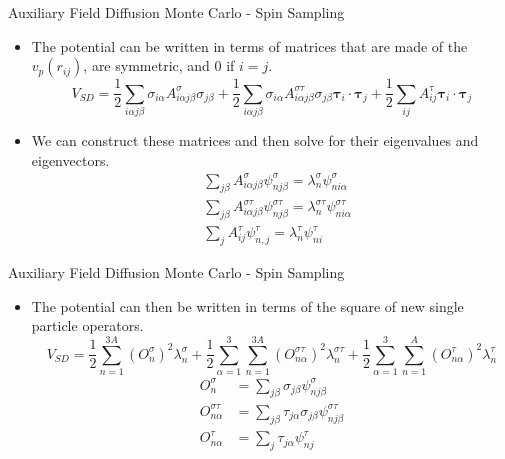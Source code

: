 \documentclass{beamer}
\newcommand{\ti}{\bm{\tau}_i}
\newcommand{\tj}{\bm{\tau}_j}
\begin{document}
\begin{frame}{Auxiliary Field Diffusion Monte Carlo - Spin Sampling}
\begin{itemize}
   \item The potential can be written in terms of matrices that are made of the $v_p(r_{ij})$, are symmetric, and 0 if $i=j$.
   \begin{equation*}
      V_{SD} = \frac{1}{2}\sum\limits_{i\alpha j\beta} \sigma_{i\alpha}A^{\sigma}_{i\alpha j\beta}\sigma_{j\beta}
      + \frac{1}{2}\sum\limits_{i\alpha j\beta} \sigma_{i\alpha}A^{\sigma\tau}_{i\alpha j\beta}\sigma_{j\beta}\ti\cdot\tj
      + \frac{1}{2}\sum\limits_{ij} A^{\tau}_{ij}\ti\cdot\tj
   \end{equation*}
   \item We can construct these matrices and then solve for their eigenvalues and eigenvectors.
\begin{align*}
   &\sum\limits_{j\beta} A^{\sigma}_{i\alpha j\beta}\psi^{\sigma}_{nj\beta} = \lambda^{\sigma}_n\psi^{\sigma}_{ni\alpha} \\
   &\sum\limits_{j\beta} A^{\sigma\tau}_{i\alpha j\beta}\psi^{\sigma\tau}_{n j\beta} = \lambda^{\sigma\tau}_n\psi^{\sigma\tau}_{ni\alpha} \\
   &\sum\limits_{j} A^{\tau}_{ij}\psi^{\tau}_{n,j} = \lambda^{\tau}_n\psi^{\tau}_{ni}
\end{align*}
\end{itemize}
\end{frame}

\begin{frame}{Auxiliary Field Diffusion Monte Carlo - Spin Sampling}
\begin{itemize}
   \item The potential can then be written in terms of the square of new single particle operators.
   \begin{equation*}
      V_{SD} = \frac{1}{2}\sum\limits_{n=1}^{3A} \left(O_{n}^{\sigma}\right)^2 \lambda_n^{\sigma}
      + \frac{1}{2}\sum\limits_{\alpha=1}^{3}\sum\limits_{n=1}^{3A} \left(O_{n\alpha}^{\sigma\tau}\right)^2 \lambda_n^{\sigma\tau}
       + \frac{1}{2}\sum\limits_{\alpha=1}^{3}\sum\limits_{n=1}^{A} \left(O_{n\alpha}^{\tau}\right)^2 \lambda_n^{\tau}
   \end{equation*}
   \begin{equation*}
   \begin{split}
      O_{n}^{\sigma} &= \sum\limits_{j\beta} \sigma_{j\beta}\psi_{nj\beta}^{\sigma} \\
      O_{n\alpha}^{\sigma\tau} &= \sum\limits_{j\beta} \tau_{j\alpha}\sigma_{j\beta}\psi_{nj\beta}^{\sigma\tau} \\
      O_{n\alpha}^{\tau} &= \sum\limits_{j} \tau_{j\alpha}\psi_{nj}^{\tau}
   \end{split}
   \end{equation*}
\end{itemize}
\end{frame}
\end{document}
